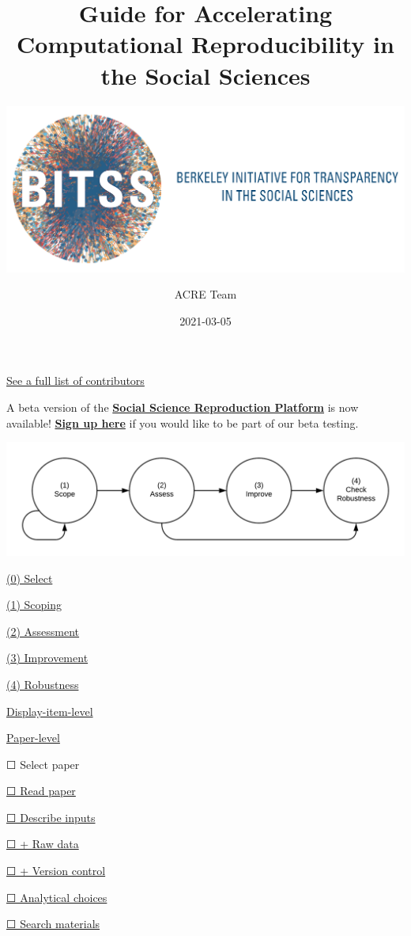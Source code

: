 \documentclass[
]{book}
\title{Guide for Accelerating Computational Reproducibility in the Social Sciences}
\subtitle{\href{https://www.bitss.org/}{\includegraphics{BITSS_logo_horizontal.png}}}
\author{ACRE Team}
\date{2021-03-05}
\begin{document}
\maketitle

{
\setcounter{tocdepth}{1}
\tableofcontents
}
\hypertarget{section}{%
\chapter*{}\label{section}}

\protect\hyperlink{contributions}{See a full list of contributors}

A beta version of the \href{https://www.socialsciencereproduction.org/}{\textbf{Social Science Reproduction Platform}} is now available! \href{https://forms.gle/yZivWcwijCzEhrBU6}{\textbf{Sign up here}} if you would like to be part of our beta testing.

\includegraphics[width=1\linewidth]{stages}

\protect\hyperlink{select}{(0) Select}

\protect\hyperlink{scoping}{(1) Scoping}

\protect\hyperlink{assessment}{(2) Assessment}

\protect\hyperlink{improvements}{(3) Improvement}

\protect\hyperlink{robust}{(4) Robustness}

\protect\hyperlink{di-imp}{Display-item-level}

\protect\hyperlink{paper-level}{Paper-level}

☐ Select paper

\protect\hyperlink{read-summ}{☐ Read paper}

\protect\hyperlink{describe-inputs}{☐ Describe inputs}

\protect\hyperlink{rd}{☐ + Raw data}

\protect\hyperlink{paper-level}{☐ + Version control}

\protect\hyperlink{id-analy}{☐ Analytical choices}

\protect\hyperlink{declaree}{☐ Search materials}
\end{document}
